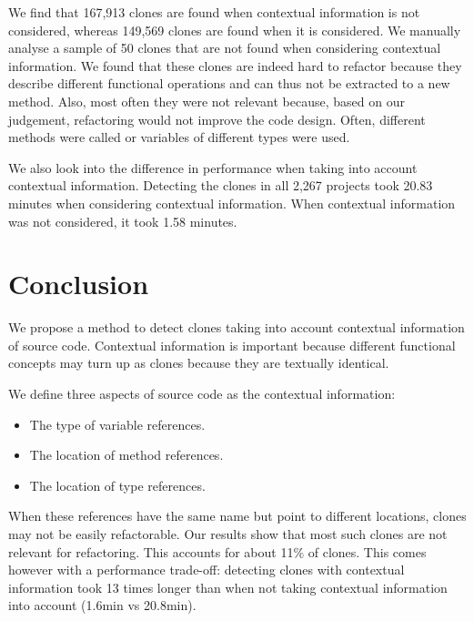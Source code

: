 \documentclass[conference]{IEEEtran}
\begin{document}
We find that 167,913 clones are found when contextual information is not considered, whereas 149,569 clones are found when it is considered. We manually analyse a sample of 50 clones that are not found when considering contextual information. We found that these clones are indeed hard to refactor because they describe different functional operations and can thus not be extracted to a new method. Also, most often they were not relevant because, based on our judgement, refactoring would not improve the code design. Often, different methods were called or variables of different types were used. 

We also look into the difference in performance when taking into account contextual information. Detecting the clones in all 2,267 projects took 20.83 minutes when considering contextual information. When contextual information was not considered, it took 1.58 minutes.  

\section{Conclusion}
We propose a method to detect clones taking into account contextual information of source code. Contextual information is important because different functional concepts may turn up as clones because they are textually identical.

We define three aspects of source code as the contextual information:
\begin{itemize}
    \item The type of variable references.
    \item The location of method references.
    \item The location of type references.
\end{itemize}
When these references have the same name but point to different locations, clones may not be easily refactorable. Our results show that most such clones are not relevant for refactoring. This accounts for about 11\% of clones. This comes however with a performance trade-off: detecting clones with contextual information took 13 times longer than when not taking contextual information into account (1.6min vs 20.8min).



\end{document}
